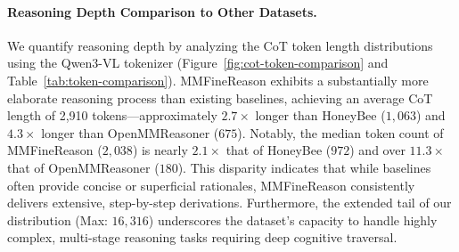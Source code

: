 \paragraph{Reasoning Depth Comparison to Other Datasets.} 
We quantify reasoning depth by analyzing the CoT token length distributions using the Qwen3-VL tokenizer (Figure~\ref{fig:cot-token-comparison} and Table~\ref{tab:token-comparison}). MMFineReason exhibits a substantially more elaborate reasoning process than existing baselines, achieving an average CoT length of 2,910 tokens—approximately $2.7\times$ longer than HoneyBee ($1,063$) and $4.3\times$ longer than OpenMMReasoner ($675$). Notably, the median token count of MMFineReason ($2,038$) is nearly $2.1\times$ that of HoneyBee ($972$) and over $11.3\times$ that of OpenMMReasoner ($180$). This disparity indicates that while baselines often provide concise or superficial rationales, MMFineReason consistently delivers extensive, step-by-step derivations. Furthermore, the extended tail of our distribution (Max: $16,316$) underscores the dataset's capacity to handle highly complex, multi-stage reasoning tasks requiring deep cognitive traversal.

